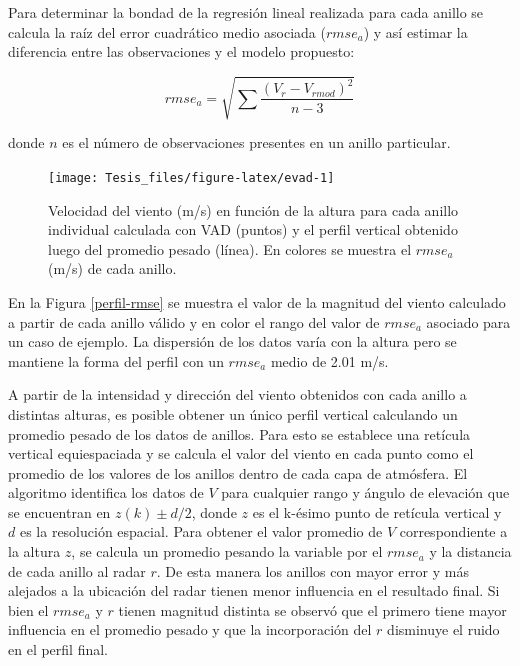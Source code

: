 \documentclass[12pt,spanish,oneside, a4paper]{book}
\begin{document}
Para determinar la bondad de la regresión lineal realizada para cada
anillo se calcula la raíz del error cuadrático medio asociada
(\(rmse_a\)) y así estimar la diferencia entre las observaciones y el
modelo propuesto:

\begin{equation}\label{eq-vr8}
rmse_a = \sqrt {\sum \frac {(V_r - V_{rmod} )^2} {n-3}}
\end{equation}

donde \(n\) es el número de observaciones presentes en un anillo
particular.

\begin{figure}

{\centering \texttt{[image: Tesis\_files/figure-latex/evad-1]} 

}

\caption{Velocidad del viento (m/s) en función de la altura para cada anillo individual calculada con VAD (puntos) y el perfil vertical obtenido luego del promedio pesado (línea). En colores se muestra el $rmse_a$ (m/s) de cada anillo. \label{perfil-rmse}}\label{fig:evad}
\end{figure}

En la Figura \ref{perfil-rmse} se muestra el valor de la magnitud del
viento calculado a partir de cada anillo válido y en color el rango del
valor de \(rmse_a\) asociado para un caso de ejemplo. La dispersión de
los datos varía con la altura pero se mantiene la forma del perfil con
un \(rmse_a\) medio de 2.01 m/s.

A partir de la intensidad y dirección del viento obtenidos con cada
anillo a distintas alturas, es posible obtener un único perfil vertical
calculando un promedio pesado de los datos de anillos. Para esto se
establece una retícula vertical equiespaciada y se calcula el valor del
viento en cada punto como el promedio de los valores de los anillos
dentro de cada capa de atmósfera. El algoritmo identifica los datos de
\(V\) para cualquier rango y ángulo de elevación que se encuentran en
\(z(k) \pm d/2\), donde \(z\) es el k-ésimo punto de retícula vertical y
\(d\) es la resolución espacial. Para obtener el valor promedio de \(V\)
correspondiente a la altura \(z\), se calcula un promedio pesando la
variable por el \(rmse_a\) y la distancia de cada anillo al radar \(r\).
De esta manera los anillos con mayor error y más alejados a la ubicación
del radar tienen menor influencia en el resultado final. Si bien el
\(rmse_a\) y \(r\) tienen magnitud distinta se observó que el primero
tiene mayor influencia en el promedio pesado y que la incorporación del
\(r\) disminuye el ruido en el perfil final.
\end{document}
